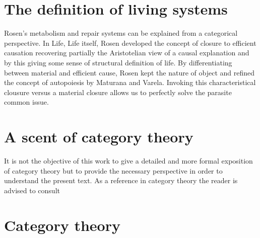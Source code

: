 \documentclass[aps,twocolumn]{revtex4-1}
\begin{document}
\section{The definition of living systems}

Rosen's metabolism and repair systems can be explained from a categorical perspective. In Life, Life itself, Rosen developed the concept of closure to efficient causation recovering partially the Aristotelian view of a causal explanation and by this giving some sense of structural definition of life. By differentiating between material and efficient cause, Rosen kept the nature of object and refined the concept of autopoiesis by Maturana and Varela. Invoking this characteristical clousure versus a material closure allows us to perfectly solve the parasite common issue.

\section{A scent of category theory}
It is not the objective of this work to give a detailed and more formal exposition of category theory but to provide the necessary perspective in order to understand the present text. As a reference in category theory the reader is advised to consult




 



\appendix

\section{Category theory}\label{app:CatTh}


%
\end{document}
